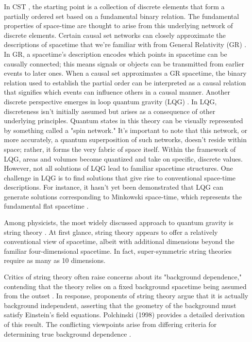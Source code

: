 \documentclass[11pt]{article}
\begin{document}
In CST \cite{wuthrich2012structure}, the starting point is a collection of discrete elements that form a partially ordered set based on a fundamental binary relation. The fundamental properties of space-time are thought to arise from this underlying network of discrete elements. Certain causal set networks can closely approximate the descriptions of spacetime that we're familiar with from General Relativity (GR) \cite{belot2011background}. In GR, a spacetime's description encodes which points in spacetime can be causally connected; this means signals or objects can be transmitted from earlier events to later ones. When a causal set approximates a GR spacetime, the binary relation used to establish the partial order can be interpreted as a causal relation that signifies which events can influence others in a causal manner.
Another discrete perspective emerges in loop quantum gravity (LQG) \cite{gambini2011first,kiefer2012quantum,rickles2006structural} . In LQG, discreteness isn't initially assumed but arises as a consequence of other underlying principles. Quantum states in this theory can be visually represented by something called a "spin network." It's important to note that this network, or more accurately, a quantum superposition of such networks, doesn't reside within space; rather, it forms the very fabric of space itself. Within the framework of LQG, areas and volumes become quantized and take on specific, discrete values. However, not all solutions of LQG lead to familiar spacetime structures. One challenge in LQG is to find solutions that give rise to conventional space-time descriptions. For instance, it hasn't yet been demonstrated that LQG can generate solutions corresponding to Minkowski space-time, which represents the fundamental flat spacetime \cite{oriti2009approaches}.

Among physicists, the most widely discussed approach to quantum gravity is string theory \cite{zwiebach2009first}. At first glance, string theory appears to offer a relatively conventional view of spacetime, albeit with additional dimensions beyond the familiar four-dimensional spacetime. In fact, super-symmetric string theories require as many as 10 dimensions.

Critics of string theory \cite{smolin2006trouble} often raise concerns about its "background dependence," contending that the theory relies on a fixed background spacetime being assumed from the outset \cite{dawid2006underdetermination}. In response, proponents of string theory argue that it is actually background independent, asserting that the geometry of the background must satisfy Einstein's field equations. Polchinski (1998) \cite{polchinski1998string} provides a detailed derivation of this result. The conflicting viewpoints arise from differing criteria for determining true background dependence \cite{becker2006string}.
\end{document}
